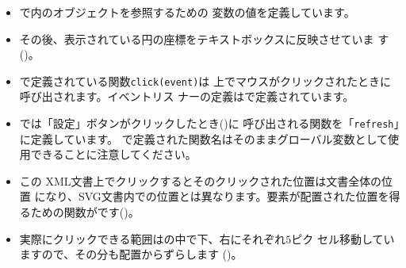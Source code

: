 \begin{itemize}
 \item {}で\HTML 内のオブジェクトを参照するための
       変数の値を定義しています。
 \item その後、表示されている円の座標をテキストボックスに反映させていま
       す()。
  \item {}で定義されている関数\texttt{click(event)}は
       \SVG 上でマウスがクリックされたときに呼び出されます。イベントリス
       ナーの定義はで定義されています。
 \item {}では「設定」ボタンがクリックしたとき()に
       呼び出される関数を「\texttt{refresh}」に定義しています。
       で定義された関数名はそのままグローバル変数として使
       用できることに注意してください。
 \item この XML文書上でクリックするとそのクリックされた位置は文書全体の位置
       になり、SVG文書内での位置とは異なります。要素が配置された位置を得
       るための関数がです()。
 \item 実際にクリックできる範囲はの中で下、右にそれぞれ$5$ピク
			 セル移動していますので、その分も配置からずらします
			 ()。


\end{itemize}
